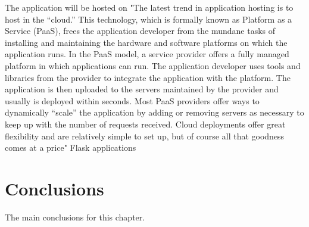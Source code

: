 The application will be hosted on 
"The latest trend in application hosting is to host in the “cloud.” This technology, which is formally known as Platform as a Service (PaaS), frees the application developer from the mundane tasks of installing and maintaining the hardware and software platforms on which the application runs. In the PaaS model, a service provider offers a fully managed platform in which applications can run. The application developer uses tools and libraries from the provider to integrate the application with the platform. The application is then uploaded to the servers maintained by the provider and usually is deployed within seconds. Most PaaS providers offer ways to dynamically “scale” the application by adding or removing servers as necessary to keep up with the number of requests received. Cloud deployments offer great flexibility and are relatively simple to set up, but of course all that goodness comes at a price" Flask applications

\section{Conclusions}

The main conclusions for this chapter.


